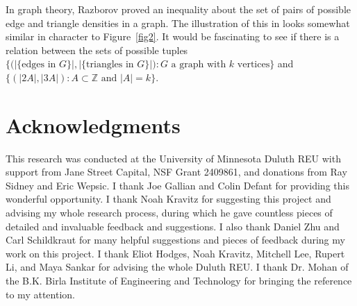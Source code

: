 \documentclass{daj}
\theoremstyle{definition}
\theoremstyle{remark}
\numberwithin{equation}{section}
\numberwithin{theorem}{section}
\newcommand{\Z}{\mathbb{Z}}
\begin{document}
In graph theory, Razborov \cite{Razborov08} proved an inequality about the set of pairs of possible edge and triangle densities in a graph. The illustration of this in \cite[Figure 5.1]{Zhao23} looks somewhat similar in character to Figure~\ref{fig2}. It would be fascinating to see if there is a relation between the sets of possible tuples $\big\{\big(|\{\text{edges in }G\}|, |\{\text{triangles in }G\}|\big):G \text{ a graph with $k$ vertices}\big\}$ and $\{(|2A|,|3A|):A \subset \Z \text{ and } |A| = k\}$. 


\section*{Acknowledgments}
This research was conducted at the University of Minnesota Duluth REU with support from Jane Street Capital, NSF Grant 2409861, and donations from Ray Sidney and Eric Wepsic. I thank Joe Gallian and Colin Defant for providing this wonderful opportunity. I thank Noah Kravitz for suggesting this project and advising my whole research process, during which he gave countless pieces of detailed and invaluable feedback and suggestions. I also thank Daniel Zhu and Carl Schildkraut for many helpful suggestions and pieces of feedback during my work on this project. I thank Eliot Hodges, Noah Kravitz, Mitchell Lee, Rupert Li, and Maya Sankar for advising the whole Duluth REU. I thank Dr. Mohan of the B.K. Birla Institute of Engineering and Technology for bringing the reference \cite{TX19} to my attention.
\end{document}
